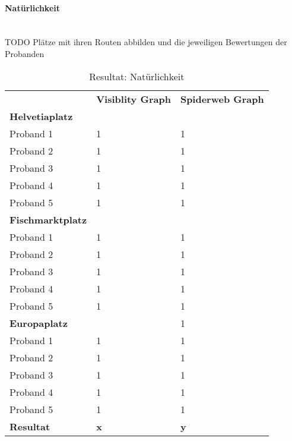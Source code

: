 \paragraph{Natürlichkeit}\label{result:Natürlichkeit}~\\
TODO Plätze mit ihren Routen abbilden und die jeweiligen Bewertungen der Probanden
\begin{table}[ht]
    \centering
    \caption{Resultat: Natürlichkeit}
    \label{Resultat: Natürlichkeit}
    \begin{tabular}{lll}
        & \textbf{Visiblity Graph} & \textbf{Spiderweb Graph} \\
        \textbf{Helvetiaplatz}   &                          &                          \\
        Proband 1                & 1                        & 1                        \\
        Proband 2                & 1                        & 1                        \\
        Proband 3                & 1                        & 1                        \\
        Proband 4                & 1                        & 1                        \\
        Proband 5                & 1                        & 1                        \\
        \textbf{Fischmarktplatz} &                          &                          \\
        Proband 1                & 1                        & 1                        \\
        Proband 2                & 1                        & 1                        \\
        Proband 3                & 1                        & 1                        \\
        Proband 4                & 1                        & 1                        \\
        Proband 5                & 1                        & 1                        \\
        \textbf{Europaplatz}     &                          & 1                        \\
        Proband 1                & 1                        & 1                        \\
        Proband 2                & 1                        & 1                        \\
        Proband 3                & 1                        & 1                        \\
        Proband 4                & 1                        & 1                        \\
        Proband 5                & 1                        & 1                        \\
        \textbf{Resultat}        & \textbf{x}               & \textbf{y}                       
    \end{tabular}
\end{table}

